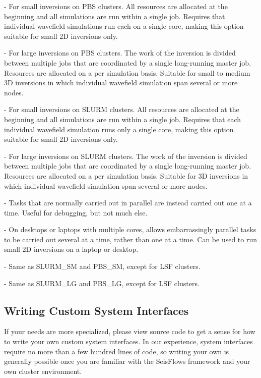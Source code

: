 \documentclass[letterpaper,10pt,english]{sphinxmanual}
\begin{document}
 - For small inversions on PBS clusters. All resources are allocated at the beginning and all simulations are run within a single job.  Requires that individual wavefield simulations run each on a single core, making this option suitable for small 2D inversions only.

 - For large inversions on PBS clusters. The work of the inversion is divided between multiple jobs that are coordinated by a single long-running master job. Resources are allocated on a per simulation basis.  Suitable for small to medium 3D inversions in which individual wavefield simulation span several or more nodes.

 - For small inversions on SLURM clusters. All resources are allocated at the beginning and all simulations are run within a single job.  Requires that each individual wavefield simulation runs only a single core, making this option suitable for small 2D inversions only.

 - For large inversions on SLURM clusters. The work of the inversion is divided between multiple jobs that are coordinated by a single long-running master job. Resources are allocated on a per simulation basis. Suitable for 3D inversions in which individual wavefield simulation span several or more nodes.

 - Tasks that are normally carried out in parallel are instead carried out one at a time. Useful for debugging, but not much else.

 - On desktops or laptops with multiple cores, allows embarrassingly parallel tasks to be carried out several at a time, rather than one at a time.  Can be used to run small 2D inversions on a laptop or desktop.

 - Same as SLURM\_SM and PBS\_SM, except for LSF clusters.

 - Same as SLURM\_LG and PBS\_LG, except for LSF clusters.


\subsection{Writing Custom System Interfaces}
\label{\detokenize{main/usage:writing-custom-system-interfaces}}
If your needs are more specialized, please view  source code to get a sense for how to write your own custom system interfaces. In our experience, system interfaces require no more than a few hundred lines of code, so writing your own is generally possible once you are familiar with the SeisFlows framework and your own cluster environment.
\end{document}
